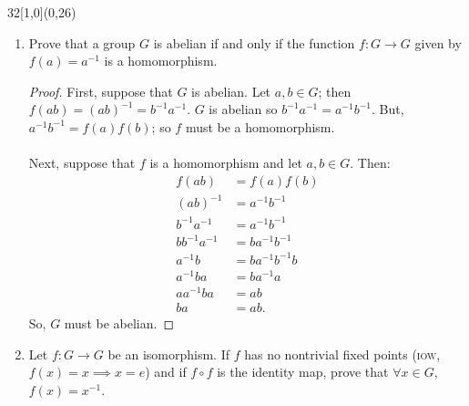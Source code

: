 \documentclass[12pt]{article}
\newenvironment{exercise}[2]{\begin{textblock}{32}[1,0](0,#2)\noindent#1\end{textblock}}{\vspace{1in}}
\begin{document}
\begin{exercise}{1.50}{26}
	\quad
	\begin{enumerate}[(i.)]
		\item Prove that a group $G$ is abelian if and only if the function $f:G\to G$ given by $f(a)=a^{-1}$ is a homomorphism.
		\bigskip
		\begin{proof}
			First, suppose that $G$ is abelian. Let $a,b\in G$; then $f(ab)=(ab)^{-1}=b^{-1}a^{-1}$. $G$ is abelian so $b^{-1}a^{-1}=a^{-1}b^{-1}$. But, $a^{-1}b^{-1}=f(a)f(b)$; so $f$ must be a homomorphism.\\
			\\
			Next, suppose that $f$ is a homomorphism and let $a,b\in G$. Then:
			\begin{align*}
				f(ab)&=f(a)f(b)\\
				(ab)^{-1}&=a^{-1}b^{-1}\\
				b^{-1}a^{-1}&=a^{-1}b^{-1}\\
				bb^{-1}a^{-1}&=ba^{-1}b^{-1}\\
				a^{-1}b&=ba^{-1}b^{-1}b\\
				a^{-1}ba&=ba^{-1}a\\
				aa^{-1}ba&=ab\\
				ba&=ab.
			\end{align*}
			So, $G$ must be abelian.
		\end{proof}

		\item Let $f:G\to G$ be an isomorphism. If $f$ has no nontrivial fixed points (\textsc{iow}, $f(x)=x\implies x=e$) and if $f\circ f$ is the identity map, prove that $\forall x\in G$, $f(x)=x^{-1}$.
	\end{enumerate}
\end{exercise}
\end{document}
